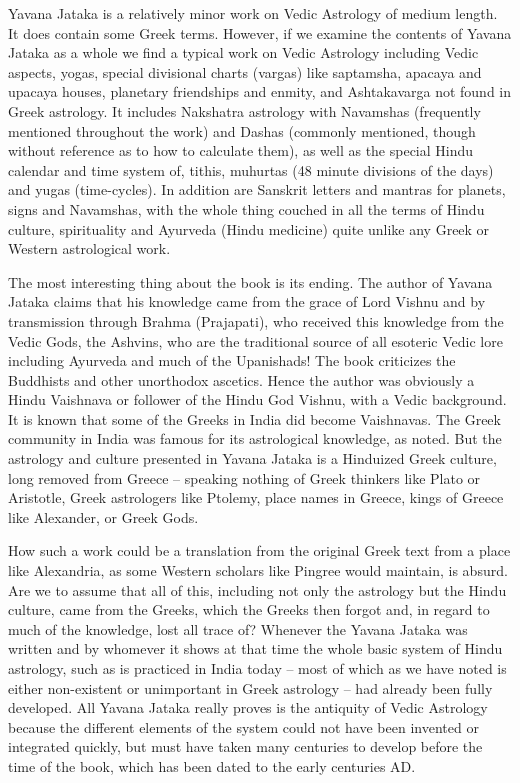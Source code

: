 

Yavana Jataka is a relatively minor work on Vedic Astrology of medium length. It does contain some Greek terms. However, if we examine the contents of Yavana Jataka as a whole we find a typical work on Vedic Astrology including Vedic aspects, yogas, special divisional charts (vargas) like saptamsha, apacaya and upacaya houses, planetary friendships and enmity, and Ashtakavarga not found in Greek astrology. It includes Nakshatra astrology with Navamshas (frequently mentioned throughout the work) and Dashas (commonly mentioned, though without reference as to how to calculate them), as well as the special Hindu calendar and time system of, tithis, muhurtas (48 minute divisions of the days) and yugas (time-cycles). In addition are Sanskrit letters and mantras for planets, signs and Navamshas, with the whole thing couched in all the terms of Hindu culture, spirituality and Ayurveda (Hindu medicine) quite unlike any Greek or Western astrological work.

 

The most interesting thing about the book is its ending. The author of Yavana Jataka claims that his knowledge came from the grace of Lord Vishnu and by transmission through Brahma (Prajapati), who received this knowledge from the Vedic Gods, the Ashvins, who are the traditional source of all esoteric Vedic lore including Ayurveda and much of the Upanishads! The book criticizes the Buddhists and other unorthodox ascetics. Hence the author was obviously a Hindu Vaishnava or follower of the Hindu God Vishnu, with a Vedic background. It is known that some of the Greeks in India did become Vaishnavas. The Greek community in India was famous for its astrological knowledge, as noted. But the astrology and culture presented in Yavana Jataka is a Hinduized Greek culture, long removed from Greece – speaking nothing of Greek thinkers like Plato or Aristotle, Greek astrologers like Ptolemy, place names in Greece, kings of Greece like Alexander, or Greek Gods.

 

How such a work could be a translation from the original Greek text from a place like Alexandria, as some Western scholars like Pingree would maintain, is absurd. Are we to assume that all of this, including not only the astrology but the Hindu culture, came from the Greeks, which the Greeks then forgot and, in regard to much of the knowledge, lost all trace of? Whenever the Yavana Jataka was written and by whomever it shows at that time the whole basic system of Hindu astrology, such as is practiced in India today – most of which as we have noted is either non-existent or unimportant in Greek astrology – had already been fully developed. All Yavana Jataka really proves is the antiquity of Vedic Astrology because the different elements of the system could not have been invented or integrated quickly, but must have taken many centuries to develop before the time of the book, which has been dated to the early centuries AD.


